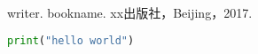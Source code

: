 \documentclass{cumcmthesis}
\begin{document}
	
	\newpage
	\begin{thebibliography}{9} %
		writer.
		\newblock bookname\allowbreak [J].
		\newblock xx出版社，Beijing，2017.
	\end{thebibliography}
	\begin{appendices}  
		\begin{lstlisting}[language={python}]  
			print("hello world")
		\end{lstlisting}  %
	\end{appendices}
\end{document}
